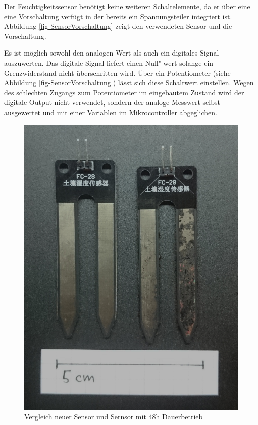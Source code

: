 Der Feuchtigkeitssensor benötigt keine weiteren Schaltelemente, da er über eine eine Vorschaltung verfügt in der bereits ein Spannungsteiler integriert ist. 
Abbildung \ref{fig-SensorVorschaltung} zeigt den verwendeten Sensor und die Vorschaltung. 

Es ist möglich sowohl den analogen Wert als auch ein digitales Signal auszuwerten.
Das digitale Signal liefert einen Null"-wert solange ein Grenzwiderstand nicht überschritten wird. 
Über ein  Potentiometer (siehe Abbildung \ref{fig-SensorVorschaltung}) lässt sich diese Schaltwert einstellen. 
Wegen des schlechten Zugangs zum Potentiometer im eingebautem Zustand wird der digitale Output nicht verwendet, sondern der analoge Messwert selbst ausgewertet und mit einer Variablen im Mikrocontroller abgeglichen.

\begin{figure}[!b]
	\centering
	\includegraphics[width=0.9\linewidth]{bilder/_fechtesensorVergleich0.jpg}
	\caption{Vergleich neuer Sensor und Sernsor mit 48h Dauerbetrieb}
	\label{fig-SensorVergleich}
\end{figure}

